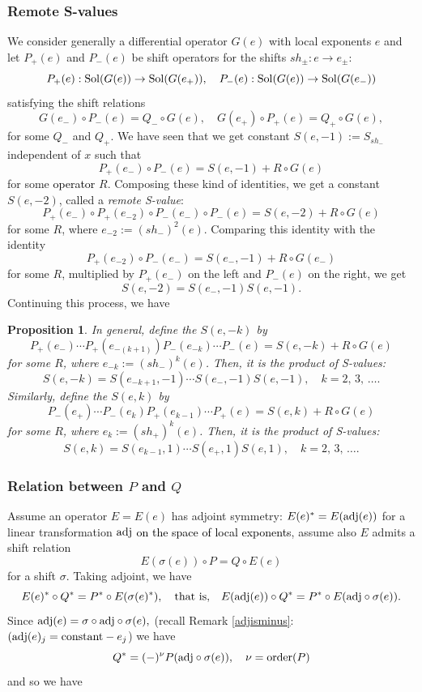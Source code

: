 \documentclass[a4paper,12pt]{article}
\newtheorem{prp}[thm]{Proposition}
\theoremstyle{definition}
\theoremstyle{remark}
\numberwithin{equation}{section} %
\newcommand{\blue}[1]{\textcolor{black}{#1}}
\begin{document}
\subsubsection{Remote S-values}\label{GenShiftRemote}
 We consider generally a differential operator $G(e)$ with local exponents $e$
and let $P_+(e)$ and $P_-(e)$ be shift operators for the shifts $sh_\pm:e\to e_\pm$:
   $$P_+(e): {\rm Sol}(G(e))\to {\rm Sol}(G(e_+)),\quad P_-(e): {\rm Sol}(G(e))\to {\rm Sol}(G(e_-))$$
satisfying the shift relations
   $$G(e_-)\circ P_-(e)=Q_-\circ G(e),\quad G(e_+)\circ P_+(e)=Q_+\circ G(e),$$
for some $Q_-$ and $Q_+$.
We have seen that we get constant $S(e,-1):=S_{sh_-}$ independent of $x$ such that 
  $$P_+(e_-)\circ P_-(e)=S(e,-1)+R\circ G(e)$$
for some \blue{operator} $R$. Composing these kind of identities,
we get a constant $S(e,-2)$, called a {\it remote S-value}: 
  $$P_+(e_-)\circ P_+(e_{-2})\circ P_-(e_-)\circ P_-(e)=S(e,-2)+R\circ G(e)$$
for some $R$, where $e_{-2}:=(sh_-)^2(e)$.  Comparing this identity with the identity 
  $$P_+(e_{-2})\circ P_-(e_-)=S(e_-,-1)+R\circ G(e_-)$$
for some $R$, 
multiplied by $P_+(e_-)$ on the left and $P_-(e)$ on the right, we get
 $$S(e,-2)=S(e_-,-1)S(e,-1).$$
Continuing this process, we have
\begin{prp}\label{remoteS} In general, define the 
  $S(e,-k)$   by
  $$P_+(e_-)\cdots P_+(e_{-(k+1)})P_-(e_{-k})\cdots P_-(e)=S(e,-k)+R\circ G(e)$$
  for some $R$, where $e_{-k}:=(sh_-)^k(e)$.  Then, it is the product of S-values:
 $$S(e,-k)=S(e_{-k+1},-1)\cdots S(e_-,-1)S(e,-1),\quad k=2,\, 3,\, \dots.$$
  Similarly, define  the  $S(e,k)$ by
  $$P_-(e_+)\cdots P_-(e_{k})P_+(e_{k-1})\cdots P_+(e)=S(e,k)+R\circ G(e)$$
  for some $R$, where $e_{k}:=(sh_+)^k(e)$.   Then, it is the product of S-values:
  $$S(e,k)=S(e_{k-1},1)\cdots S(e_+,1)S(e,1),\quad k=2,\, 3,\, \dots.$$
\end{prp}

\subsubsection{Relation between $P$ and $Q$}\label{RelationPQ}
Assume an operator $E=E(e)$  has adjoint symmetry: $E(e)^*=E({\rm adj}(e))$ for a linear transformation ${\rm adj}$ \blue{on the space of local exponents}, assume also $E$ admits a shift relation
$$E(\sigma(e))\circ P=Q\circ E(e)$$
for a shift $\sigma$. Taking adjoint, we have
  $$E(e)^*\circ Q^*=P^*\circ E(\sigma(e)^*),\quad{\rm that\ is,}\quad E({\rm adj}(e))\circ Q^*=P^*\circ E({\rm adj}\circ \sigma(e)).$$
Since ${\rm adj}(e)=\sigma\circ {\rm adj}\circ\sigma(e),$ (recall Remark \ref{adjisminus}: $({\rm adj}(e)_j={\rm constant}-e_j$)
we have
  $$Q^*=(-)^\nu P({\rm adj}\circ \sigma(e)),\quad \nu={\rm order}(P)$$
and so we have
\end{document}
